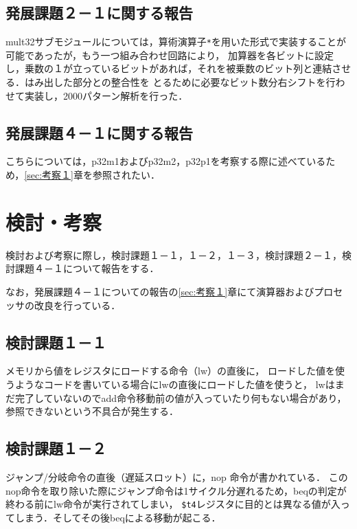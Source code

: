 \documentclass{jarticle}[11pt]
\begin{document}
  \subsection{発展課題２－１に関する報告}

  mult32サブモジュールについては，算術演算子\verb|*|を用いた形式で実装することが可能であったが，もう一つ組み合わせ回路により，
  加算器を各ビットに設定し，乗数の１が立っているビットがあれば，それを被乗数のビット列と連結させる．はみ出した部分との整合性を
  とるために必要なビット数分右シフトを行わせて実装し，2000パターン解析を行った．

  \subsection{発展課題４－１に関する報告}

  こちらについては，p32m1およびp32m2，p32p1を考察する際に述べているため，\ref{sec:考察１}章を参照されたい．

  \section{検討・考察}\label{sec:検討・考察}

  検討および考察に際し，検討課題１－１，１－２，１－３，検討課題２－１，検討課題４－１について報告をする．
  
  なお，発展課題４－１についての報告の\ref{sec:考察１}章にて演算器およびプロセッサの改良を行っている．
  
  \subsection{検討課題１－１}

  メモリから値をレジスタにロードする命令（lw）の直後に，
  ロードした値を使うようなコードを書いている場合にlwの直後にロードした値を使うと，
  lwはまだ完了していないのでadd命令移動前の値が入っていたり何もない場合があり，参照できないという不具合が発生する．

  \subsection{検討課題１－２}

  ジャンプ/分岐命令の直後（遅延スロット）に，nop 命令が書かれている．
  このnop命令を取り除いた際にジャンプ命令は1サイクル分遅れるため，beqの判定が終わる前にlw命令が実行されてしまい，
  \verb|$t4|レジスタに目的とは異なる値が入ってしまう．そしてその後beqによる移動が起こる．
\end{document}
